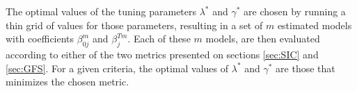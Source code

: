 The optimal values of the tuning parameters $\lambda^*$ and $\gamma^*$ are chosen by running a thin grid of values for those parameters, resulting in a set of $m$ estimated models with coefficients $\beta_{0j}^m$ and $\beta_j^{Tm}$. Each of these $m$ models, are then evaluated according to either of the two metrics presented on sections \ref{sec:SIC} and \ref{sec:GFS}. For a given criteria, the optimal values of $\lambda^*$ and $\gamma^*$  are those that minimizes the chosen metric.





